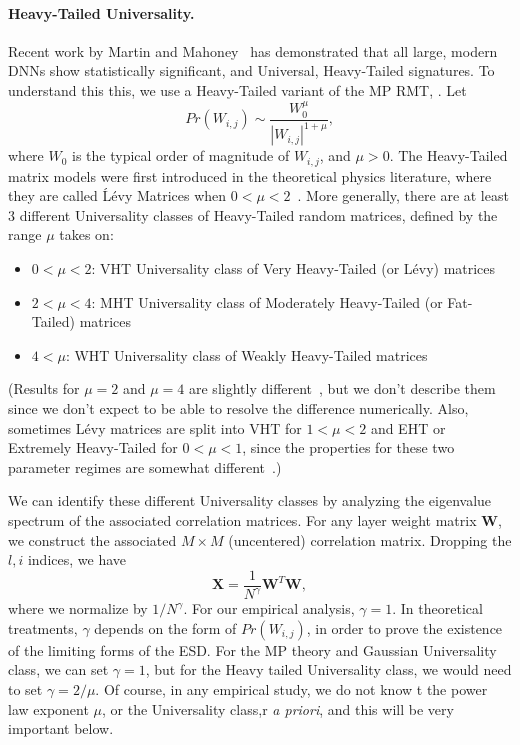 \paragraph{Heavy-Tailed Universality.} 
Recent work by Martin and Mahoney~\cite{MM18_TR} 
has demonstrated that all large, modern DNNs show statistically significant, and Universal, Heavy-Tailed signatures.  
To understand this this, we use a Heavy-Tailed variant of the MP RMT, .
Let 
$$
Pr(W_{i,j})\sim\dfrac{W_{0}^{\mu}}{|W_{i,j}|^{1+\mu}}  ,
$$
where $W_{0}$ is the typical order of magnitude of $W_{i,j}$, and $\mu>0$. 
The Heavy-Tailed matrix models were first introduced in the theoretical physics literature, where they are called \'L\'evy Matrices when $0<\mu<2$~\cite{PB94}.
More generally, there are at least 3 different Universality classes of Heavy-Tailed random matrices, defined by the range $\mu$ takes on:
\begin{itemize}
\item $0<\mu<2$: VHT Universality class of Very Heavy-Tailed (or L\'evy) matrices
\item $2<\mu<4$: MHT Universality class of Moderately Heavy-Tailed (or Fat-Tailed) matrices
\item $4<\mu$: WHT Universality class of Weakly Heavy-Tailed matrices
\end{itemize}
(Results for $\mu=2$ and $\mu=4$ are slightly different~\cite{SornetteBook,BouchaudPotters03}, but we don't describe them since we don't expect to be able to resolve the difference numerically.
Also, sometimes L\'evy matrices are split into VHT for $1<\mu<2$ and EHT or Extremely Heavy-Tailed for $0<\mu<1$, since the properties for these two parameter regimes are somewhat different~\cite{SornetteBook,BouchaudPotters03}.)

We can identify these different Universality classes by analyzing the eigenvalue spectrum of the associated correlation matrices. 
For any layer weight matrix $\mathbf{W}$, we construct the associated $M\times M$ (uncentered) correlation matrix. 
Dropping the $l,i$ indices, we have
\begin{equation}
\mathbf{X} = \dfrac{1}{N^{\gamma}}\mathbf{W}^{T}\mathbf{W}  ,
\label{eqn:unc_corr_mat}
\end{equation}
where we normalize by $1/N^{\gamma}$. 
For our empirical analysis, $\gamma=1$. 
In theoretical treatments, $\gamma$ depends on the form of $Pr(W_{i,j})$, in order to prove the existence of the limiting forms of the ESD.
For the MP theory and Gaussian Universality class, we can set $\gamma=1$, but for the Heavy tailed Universality class, we would need to set $\gamma=2/\mu$.
Of course, in any empirical study, we do not know t the power law exponent $\mu$, or the Universality class,r \emph{a priori}, and this will be very important below. 


